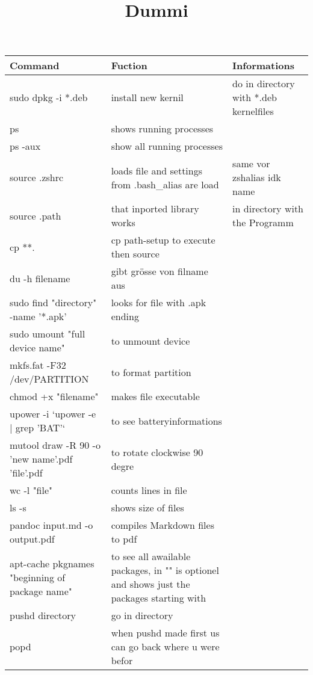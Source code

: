 \documentclass[12pt]{article}
\title{Dummi}
\begin{document}
\setlength{\parindent}{0pt}
\setlength{\parskip}{30pt}
\setlength{\baselineskip}{20pt}




\centering
\begin{tabular}{| p{6.5cm} | p{6.5cm} | p{6.5cm} |}
    \hline
    Command & Fuction & Informations \\
    \hline
    sudo dpkg -i *.deb & install new kernil & do in directory with *.deb kernelfiles \\
    \hline
    ps & shows running processes & \\
    \hline
    ps -aux & show all running processes & \\
    \hline
    source .zshrc & loads file and settings from .bash\_alias are load & same vor zshalias idk name  \\
    \hline
    source .path & that inported library works & in directory with the Programm \\
    \hline 
    cp **. & cp path-setup to execute then source &\\
    \hline
    du -h filename & gibt grösse von filname aus & \\
    \hline
    sudo find "directory" -name '*.apk' & looks for file with .apk ending &\\
    \hline 
    sudo umount "full device name" & to unmount device & \\
    \hline 
    mkfs.fat -F32 /dev/PARTITION & to format partition &\\
    \hline 
    chmod +x "filename" & makes file executable &\\
    \hline
    upower -i `upower -e | grep 'BAT'` & to see batteryinformations &\\
    \hline
    mutool draw -R 90 -o 'new name'.pdf 'file'.pdf & to rotate clockwise 90 degre &\\
    \hline 
    wc -l "file" & counts lines in file &\\
    \hline
    ls -s & shows size of files &\\
    \hline
    pandoc input.md -o output.pdf & compiles Markdown files to pdf\\
    \hline
    apt-cache pkgnames "beginning of package name"& to see all awailable packages, in "" is optionel and shows just the packages starting with \\
    \hline
    pushd directory & go in directory \\
    \hline 
    popd & when pushd made first us can go back where u were befor \\

\end{tabular}
\end{document}
